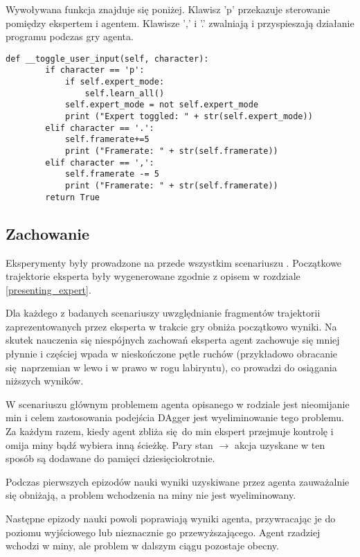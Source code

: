 Wywoływana funkcja znajduje się poniżej. Klawisz 'p' przekazuje sterowanie pomiędzy ekspertem i agentem. Klawisze ',' i '.' zwalniają i przyspieszają działanie programu podczas gry agenta.

\begin{lstlisting}[language=iPython]
    def __toggle_user_input(self, character):
        if character == 'p':
            if self.expert_mode:
                self.learn_all()
            self.expert_mode = not self.expert_mode
            print ("Expert toggled: " + str(self.expert_mode))
        elif character == '.':
            self.framerate+=5
            print ("Framerate: " + str(self.framerate))
        elif character == ',':
            self.framerate -= 5
            print ("Framerate: " + str(self.framerate))
        return True
\end{lstlisting}

\subsection{Zachowanie}
Eksperymenty były prowadzone na przede wszystkim scenariuszu . Początkowe trajektorie eksperta były wygenerowane zgodnie z opisem w rozdziale \ref{presenting_expert}.

Dla każdego z badanych scenariuszy uwzględnianie fragmentów trajektorii zaprezentowanych przez eksperta w trakcie gry obniża początkowo wyniki. Na skutek nauczenia się niespójnych zachowań eksperta agent zachowuje się mniej płynnie i częściej wpada w nieskończone pętle ruchów (przykładowo obracanie się naprzemian w lewo i w prawo w rogu labiryntu), co prowadzi do osiągania niższych wyników.

W scenariuszu  głównym problemem agenta opisanego w rodziale  jest nieomijanie min i celem zastosowania podejścia DAgger jest wyeliminowanie tego problemu. Za każdym razem, kiedy agent zbliża się do min ekspert przejmuje kontrolę i omija miny bądź wybiera inną ścieżkę. Pary stan $\to$ akcja uzyskane w ten sposób są dodawane do pamięci dziesięciokrotnie.

Podczas pierwszych epizodów nauki wyniki uzyskiwane przez agenta zauważalnie się obniżają, a problem wchodzenia na miny nie jest wyeliminowany.

Następne epizody nauki powoli poprawiają wyniki agenta, przywracając je do poziomu wyjściowego lub nieznacznie go przewyższającego. Agent rzadziej wchodzi w miny, ale problem w dalszym ciągu pozostaje obecny.

